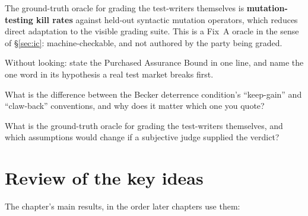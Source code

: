 \documentclass[11pt,a4paper]{article}
\theoremstyle{definition}
\theoremstyle{definition}
\theoremstyle{remark}
\begin{document}
\pdmarginpagebreak
{}
The ground-truth oracle for grading the test-writers themselves is
\textbf{mutation-testing kill rates} against held-out syntactic mutation operators,
which reduces direct adaptation to the visible grading suite. This is a
Fix~A oracle in the sense of \S\ref{sec:ic}: machine-checkable, and not authored by
the party being graded.

\begin{pdrecitation}
\item Without looking: state the Purchased Assurance Bound in one line, and name
  the one word in its hypothesis a real test market breaks first.
\item What is the difference between the Becker deterrence condition's
  ``keep-gain'' and ``claw-back'' conventions, and why does it matter which one
  you quote?
\item What is the ground-truth oracle for grading the test-writers themselves,
  and which assumptions would change if a subjective judge supplied the verdict?
\end{pdrecitation}

\section*{Review of the key ideas}

The chapter's main results, in the order later chapters use them:
\end{document}
